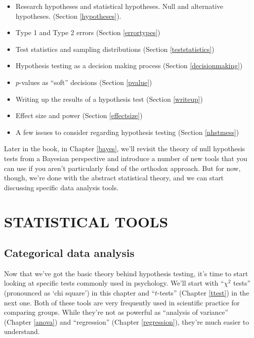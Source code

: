\documentclass[
]{book}
\providecommand{\tightlist}{%
  \setlength{\itemsep}{0pt}\setlength{\parskip}{0pt}}
\theoremstyle{definition}
\theoremstyle{definition}
\theoremstyle{definition}
\theoremstyle{definition}
\theoremstyle{remark}
\begin{document}
\begin{itemize}
\tightlist
\item
  Research hypotheses and statistical hypotheses. Null and alternative hypotheses. (Section \ref{hypotheses}).
\item
  Type 1 and Type 2 errors (Section \ref{errortypes})
\item
  Test statistics and sampling distributions (Section \ref{teststatistics})
\item
  Hypothesis testing as a decision making process (Section \ref{decisionmaking})
\item
  \(p\)-values as ``soft'' decisions (Section \ref{pvalue})
\item
  Writing up the results of a hypothesis test (Section \ref{writeup})
\item
  Effect size and power (Section \ref{effectsize})
\item
  A few issues to consider regarding hypothesis testing (Section \ref{nhstmess})
\end{itemize}

Later in the book, in Chapter \ref{bayes}, we'll revisit the theory of null hypothesis tests from a Bayesian perspective and introduce a number of new tools that you can use if you aren't particularly fond of the orthodox approach. But for now, though, we're done with the abstract statistical theory, and we can start discussing specific data analysis tools.

\hypertarget{part-statistical-tools}{%
\part*{STATISTICAL TOOLS}\label{part-statistical-tools}}

\hypertarget{chisquare}{%
\chapter{Categorical data analysis}\label{chisquare}}

Now that we've got the basic theory behind hypothesis testing, it's time to start looking at specific tests commonly used in psychology. We'll start with ``\(\chi^2\) tests'' (pronounced as `chi square') in this chapter and ``\(t\)-tests'' (Chapter \ref{ttest}) in the next one. Both of these tools are very frequently used in scientific practice for comparing groups. While they're not as powerful as ``analysis of variance'' (Chapter \ref{anova}) and ``regression'' (Chapter \ref{regression}), they're much easier to understand.
\end{document}
